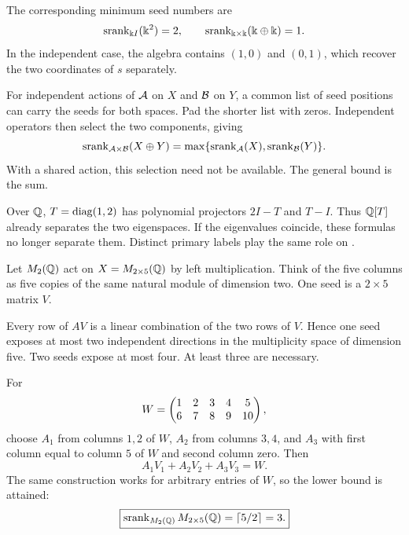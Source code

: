 
The corresponding minimum seed numbers are
\[
\srank_{\kk I}(\kk^2)=2,
\qquad
\srank_{\kk\times\kk}(\kk\oplus\kk)=1.
\]
In the independent case, the algebra contains $(1,0)$ and $(0,1)$, which recover the two coordinates of $s$ separately.

For independent actions of $\AA$ on $X$ and $\BB$ on $Y$, a common list of seed positions can carry the seeds for both spaces. Pad the shorter list with zeros. Independent operators then select the two components, giving
\[
\srank_{\AA\times\BB}(X\oplus Y)
=\max\{\srank_{\AA}(X),\srank_{\BB}(Y)\}.
\]
With a shared action, this selection need not be available. The general bound is the sum.

Over $\QQ$, $T=\diag(1,2)$ has polynomial projectors $2I-T$ and $T-I$. Thus $\QQ[T]$ already separates the two eigenspaces. If the eigenvalues coincide, these formulas no longer separate them. Distinct primary labels play the same role on .


Let $M_2(\QQ)$ act on $X=M_{2\times5}(\QQ)$ by left multiplication. Think of the five columns as five copies of the same natural module of dimension two. One seed is a $2\times5$ matrix $V$.

Every row of $AV$ is a linear combination of the two rows of $V$. Hence one seed exposes at most two independent directions in the multiplicity space of dimension five. Two seeds expose at most four. At least three are necessary.


For
\[
W=\mat{1&2&3&4&5\\6&7&8&9&10},
\]
choose $A_1$ from columns $1,2$ of $W$, $A_2$ from columns $3,4$, and $A_3$ with first column equal to column $5$ of $W$ and second column zero. Then
\[
A_1V_1+A_2V_2+A_3V_3=W.
\]
The same construction works for arbitrary entries of $W$, so the lower bound is attained:
\[
\boxed{\srank_{M_2(\QQ)}M_{2\times5}(\QQ)=\lceil5/2\rceil=3.}
\]

